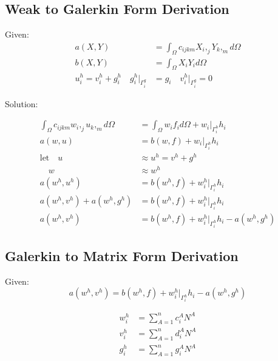 \documentclass[a4paper, 12pt]{article}
\begin{document}
\newpage
\subsection{Weak to Galerkin Form Derivation} \label{sec:GalerkinDer}

Given:
\begin{align*}
a( X, Y ) &=
  \int_{\Omega} c_{ijkm} X_{i},_{j} Y_{k},_{m} d\Omega \\
b( X, Y ) &=
  \int_{\Omega} X_{i} Y_{i} d\Omega \\
u^{h}_{i} =
  v^{h}_{i} + g^{h}_{i}
  \quad
  g^{h}_{i}\Big|_{\Gamma^{g}_{i}} &= g_{i}
  \quad
  v^{h}_{i}\Big|_{\Gamma^{g}_{i}} = 0
\end{align*}

\noindent
Solution:

\begin{align*}
\int_{\Omega} c_{ijkm} w_{i},_{j} u_{k},_{m} d\Omega
 &= \int_{\Omega} w_{i} f_{i} d\Omega
  + w_{i}\Big|_{\Gamma^{h}_{i}} h_{i} \\
a(w, u)
 &= b(w , f)
  + w_{i}\Big|_{\Gamma^{h}_{i}} h_{i}  \\
\text{let} \quad u &\approx u^{h} = v^{h} + g^{h} \\
 \quad w &\approx w^{h} \\
a(w^{h} , u^{h} )
 &= b(w^{h}, f)
  + w^{h}_{i}\Big|_{\Gamma^{h}_{i}} h_{i}  \\
a(w^{h} , v^{h} )
  + a(w^{h} , g^{h} )
 &= b(w^{h}, f)
  + w^{h}_{i}\Big|_{\Gamma^{h}_{i}} h_{i}  \\
a(w^{h} , v^{h})
 &= b(w^{h} , f)
  + w^{h}_{i}\Big|_{\Gamma^{h}_{i}} h_{i}
  - a(w^{h} , g^{h})
\end{align*}

\newpage
\subsection{Galerkin to Matrix Form Derivation} \label{sec:MatrixDer}

Given:
\begin{equation*}
a(w^{h} , v^{h})
 = b(w^{h} , f)
  + w^{h}_{i}\Big|_{\Gamma^{h}_{i}} h_{i}
  - a(w^{h} , g^{h})
\end{equation*}

\begin{align*}
w^{h}_i &= \sum_{A=1}^{n} c^{A}_i N^{A}  \\
v^{h}_i &= \sum_{A=1}^{n} d^{A}_i N^{A}  \\
g^{h}_i &=  \sum_{A=1}^{n} g^{A}_i N^{A}
\end{align*}
\end{document}
